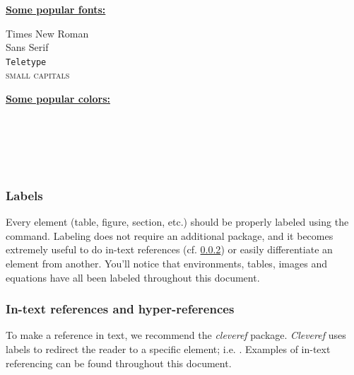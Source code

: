 \documentclass{article} %
\begin{document}
\begin{paracol}{2}
    \setlength{\columnsep}{2em}
        \begin{leftcolumn}
        
\noindent \underline{\textbf{Some popular fonts:}} \vspace{2mm}
        
\noindent \textrm{Times New Roman}\\
\textsf{Sans Serif}\\
\texttt{Teletype}\\
\textsc{small capitals}
        
        \end{leftcolumn}
        \begin{rightcolumn}
        
\noindent \underline{\textbf{Some popular colors:}} \vspace{2mm}
        
\noindent {\color{red}{Red}}\\
{\color{lime}{Lime}}\\
{}\\
{\color{azure}{Azure blue}}\\
{\color{magenta}{Magenta}}
        
        \end{rightcolumn}
\end{paracol}

\subsubsection{Labels}
\label{subsubsection:labels}
Every element (table, figure, section, etc.) should be properly labeled using the {\color{Green}{\verb+\label{}+}} command. Labeling does not require an additional package, and it becomes extremely useful to do in-text references (cf. \cref{subsubsection:references}) or easily differentiate an element from another. You'll notice that environments, tables, images and equations have all been labeled throughout this document. 


\subsubsection{In-text references and hyper-references}
\label{subsubsection:references}
To make a reference in text, we recommend the \textit{cleveref} package. \textit{Cleveref} uses labels to redirect the reader to a specific element; i.e.
\color{Green}{\verb+\cref{+}\color{black}{section:Introduction}{\color{Green}{\verb+}+}}. Examples of in-text referencing can be found throughout this document.
\end{document}
